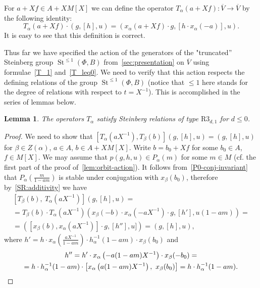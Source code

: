 \documentclass[oneside, 8pt]{amsart}
\newtheorem{lemma}{Lemma}
\theoremstyle{remark}
\theoremstyle{definition}
\numberwithin{lemma}{section}
\numberwithin{prop}{section}
\numberwithin{corollary}{section}
\numberwithin{externaltheorem}{section}
\DeclareMathOperator{\St}{St}
\numberwithin{equation}{section}
\begin{document}
For $a + Xf \in A + XM[X]$ we can define the operator $T_\alpha(a + Xf) \colon \overline{V} \to \overline{V}$ by the following identity:
\begin{equation} \label{T_leq0} T_\alpha(a + Xf) \cdot (g, [h], u) = (x_\alpha(a + Xf) \cdot g, [h \cdot x_{\alpha}(-a)], u).  \end{equation}
It is easy to see that this definition is correct.

Thus far we have specified the action of the generators of the "truncated'' Steinberg group $\St^{\leq 1}(\Phi, B)$ from~\cref{sec:presentation} on $\overline{V}$ using formulae~\eqref{T_1} and~\eqref{T_leq0}. We need to verify that this action respects the defining relations of the group $\St^{\leq 1}(\Phi, B)$ (notice that $\leq 1$ here stands for the degree of relations with respect to $t = X^{-1}$). This is accomplished in the series of lemmas below.

\begin{lemma} \label{R3_leq0_1} The operators $T_\alpha$ satisfy Steinberg relations of type $\mathrm{R3}_{d, 1}$ for $d\leq 0$. \end{lemma}
\begin{proof} We need to show that $[T_\alpha(aX^{-1}), T_\beta(b)](g, [h], u) = (g, [h], u)$ for $\beta\in Z(\alpha)$, $a\in A$, $b\in A + XM[X]$.
Write $b = b_0 + Xf$ for some $b_0 \in A$, $f \in M[X]$.
We may assume that $p(g, h, u) \in P_\alpha(m)$ for some $m \in M$  (cf. the first part of the proof of~\cref{lem:orbit-action}).
It follows from~\cref{P0-conj-invariant} that $P_\alpha\left(\tfrac{m}{1-am}\right)$ is stable under conjugation with $x_\beta(b_0)$, therefore by~\cref{SR:additivity} we have
\begin{multline} \nonumber
  \left[T_\beta(b),\ T_\alpha(aX^{-1}) \right] (g, [h], u) = \\
  = T_\beta(b) \cdot T_\alpha(aX^{-1}) \left(x_\beta(-b) \cdot x_\alpha(-aX^{-1}) \cdot g, [h'], u(1-am)\right) = \\ = \left( [x_\beta(b), x_{\alpha}(aX^{-1})] \cdot g, [h''], u] \right) = \left(g, [h], u\right), \end{multline}
where $h' = h \cdot x_{\alpha}\left(\tfrac{aX^{-1}}{1-am}\right) \cdot h^{-1}_\alpha(1-am) \cdot x_\beta(b_0)$ and
\begin{multline} \nonumber
 h'' = h' \cdot x_{\alpha}\left(-a(1-am)X^{-1}\right) \cdot x_{\beta}(-b_0) = \\
 = h \cdot h_\alpha^{-1}(1-am) \cdot \left[x_\alpha\left(a(1-am)X^{-1}\right),\ x_\beta(b_0)\right] = h \cdot h_\alpha^{-1}(1-am). \qedhere \end{multline}
\end{proof}
\end{document}
